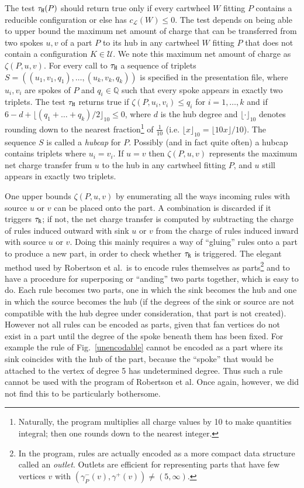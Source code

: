 \documentclass[11pt]{article}
\newcommand{\qq}{\mathbb{Q}}
\newcommand{\mcal}{\mathcal}
\newcommand{\m}{\mathcal}
\newcommand{\gm}{\gamma}
\begin{document}
The test $\tau_{\tt H}(P)$ should return true only if every cartwheel $W$ fitting $P$ contains a reducible configuration or else has $c_{\mcal{L}}(W) \leq 0$. 
The test depends on being able to upper bound the maximum net amount of charge that can be transferred from two spokes $u, v$ of a part $P$ to its hub in any cartwheel $W$ fitting $P$ that does not contain a configuration $K \in \m{U}$. We note this maximum net amount of charge as $\zeta(P, u, v)$. 
For every call to $\tau_{\tt H}$ a sequence of triplets $S = ((u_1, v_1, q_1), \dots, (u_k, v_k, q_k))$ is specified in the presentation file, where $u_i, v_i$ are spokes of $P$ and $q_i \in \qq$ such that every spoke appears in exactly two triplets. 
The test $\tau_{\tt H}$ 
returns true if $\zeta(P,u_i,v_i) \leq q_i$ for $i = 1, \dots, k$ and if $6-d + \lfloor (q_1 + \dots + q_k)/2 \rfloor_{10}\leq 0$, where $d$ is the hub degree and $\lfloor \cdot \rfloor_{10}$ denotes rounding down to the nearest fraction\footnote{Naturally, the program multiplies all charge values by 10 to make quantities integral; then one rounds down to the nearest integer.} of $\frac{1}{10}$ (i.e$.$ $\lfloor x \rfloor_{10} = \lfloor 10x \rfloor / 10$). The sequence $S$ is called a \emph{hubcap} for $P$. Possibly (and in fact quite often) a hubcap contains triplets where $u_i = v_i$. If $u = v$ then $\zeta(P,u,v)$ represents the maximum net charge transfer frum $u$ to the hub in any cartwheel fitting $P$, and $u$ still appears in exactly two triplets.


\unencodablefig

One upper bounds $\zeta(P,u,v)$ by enumerating 
all the ways incoming rules with source $u$ or $v$ can be placed onto the part. A combination is discarded if it triggers $\tau_{\tt R}$; if not, the net charge transfer is computed by subtracting the charge of rules induced outward with sink $u$ or $v$ from the charge of rules induced inward with source $u$ or $v$. 
Doing this mainly requires a way of ``gluing'' rules onto a part to produce a new part, in order to check whether $\tau_{\tt R}$ is triggered. The elegant method used by Robertson et al.~is to encode rules themselves as parts\footnote{In the program, rules are actually encoded as a more compact data structure called an \emph{outlet}. Outlets are efficient for representing parts that have few vertices $v$ with $(\gm_P^-(v), \gm^+(v)) \ne (5, \infty)$.} and to have a procedure for superposing or ``anding'' two parts together, which is easy to do. 
 Each rule becomes two parts, one in which the sink becomes 
the hub and one in which the source 
becomes the hub (if the degrees of the sink or source are not compatible with the hub degree under consideration, that part is not created). 
However not all rules can be encoded as parts, given that fan vertices do not exist in a part until the degree of the spoke beneath them has been fixed. For example the rule of Fig$.$~\ref{unencodable} cannot be encoded as a part where its sink coincides with the hub of the part, because the ``spoke'' that would be attached to the vertex of degree 5 has undetermined degree. Thus such a rule cannot be used with the program of Robertson et al. Once again, however, we did not find this to be particularly bothersome. 
\end{document}
